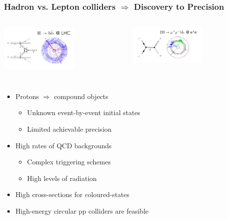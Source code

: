 \begin{frame}
  \frametitle{Hadron vs. Lepton colliders $\Rightarrow$ Discovery to Precision}
  

  \begin{columns}[t]
    \centering
    \includegraphics[width=0.6\textwidth]{figures/hadronColliders.pdf}

    \centering
    \includegraphics[width=0.6\textwidth]{figures/leptonColliders.pdf}

  \end{columns}


  \begin{columns}[t]

    \begin{itemize}
    \item Protons $\Rightarrow$ compound objects
      \begin{itemize}
      \item Unknown event-by-event initial states
      \item Limited achievable precision
      \end{itemize}
    \item High rates of QCD backgrounds
      \begin{itemize}
      \item Complex triggering schemes
      \item High levels of radiation
      \end{itemize}
    \item High cross-sections for coloured-states
    \item High-energy circular pp colliders are feasible
    \end{itemize}


\end{columns}
\end{frame}
